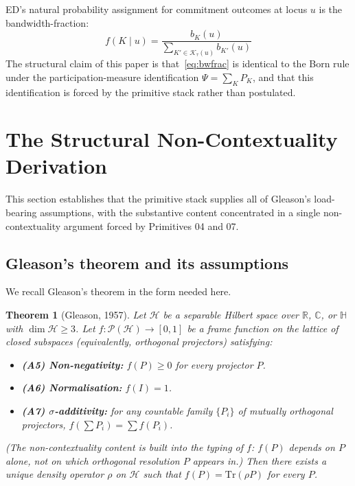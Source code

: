 \documentclass[11pt,a4paper]{article}
\newtheorem{theorem}{Theorem}[section]
\begin{document}
ED's natural probability assignment for commitment outcomes at locus $u$ is the bandwidth-fraction:
\begin{equation}
f(K \mid u) = \frac{b_K(u)}{\sum_{K' \in \mathcal{K}_\tau(u)} b_{K'}(u)}
\label{eq:bwfrac}
\end{equation}
The structural claim of this paper is that~\eqref{eq:bwfrac} is identical to the Born rule under the participation-measure identification $\Psi = \sum_K P_K$, and that this identification is forced by the primitive stack rather than postulated.

\section{The Structural Non-Contextuality Derivation}\label{sec:noncontextuality}

This section establishes that the primitive stack supplies all of Gleason's load-bearing assumptions, with the substantive content concentrated in a single non-contextuality argument forced by Primitives 04 and 07.

\subsection{Gleason's theorem and its assumptions}

We recall Gleason's theorem in the form needed here.

\begin{theorem}[Gleason, 1957]
Let $\mathcal{H}$ be a separable Hilbert space over $\mathbb{R}$, $\mathbb{C}$, or $\mathbb{H}$ with $\dim \mathcal{H} \geq 3$. Let $f : \mathscr{P}(\mathcal{H}) \to [0, 1]$ be a frame function on the lattice of closed subspaces (equivalently, orthogonal projectors) satisfying:
\begin{itemize}
  \item \textbf{(A5) Non-negativity:} $f(P) \geq 0$ for every projector $P$.
  \item \textbf{(A6) Normalisation:} $f(I) = 1$.
  \item \textbf{(A7) $\sigma$-additivity:} for any countable family $\{P_i\}$ of mutually orthogonal projectors, $f(\sum P_i) = \sum f(P_i)$.
\end{itemize}
(The non-contextuality content is built into the typing of $f$: $f(P)$ depends on $P$ alone, not on which orthogonal resolution $P$ appears in.) Then there exists a unique density operator $\rho$ on $\mathcal{H}$ such that $f(P) = \mathrm{Tr}(\rho P)$ for every $P$.
\end{theorem}
\end{document}
